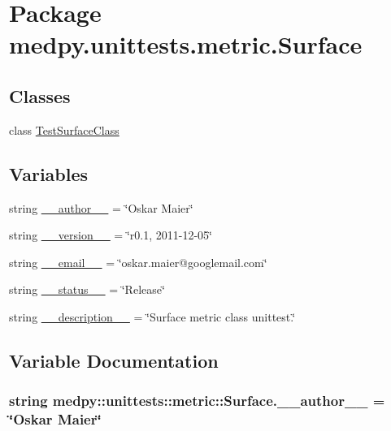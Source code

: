 \hypertarget{namespacemedpy_1_1unittests_1_1metric_1_1Surface}{
\section{Package medpy.unittests.metric.Surface}
\label{namespacemedpy_1_1unittests_1_1metric_1_1Surface}
}
\subsection*{Classes}
\begin{DoxyCompactItemize}
\item 
class \hyperlink{classmedpy_1_1unittests_1_1metric_1_1Surface_1_1TestSurfaceClass}{TestSurfaceClass}
\end{DoxyCompactItemize}
\subsection*{Variables}
\begin{DoxyCompactItemize}
\item 
string \hyperlink{namespacemedpy_1_1unittests_1_1metric_1_1Surface_aa477981e48d06be6e9008b68154da233}{\_\-\_\-author\_\-\_\-} = \char`\"{}Oskar Maier\char`\"{}
\item 
string \hyperlink{namespacemedpy_1_1unittests_1_1metric_1_1Surface_adf05ce1f02cfc20513e1f47d683a7b88}{\_\-\_\-version\_\-\_\-} = \char`\"{}r0.1, 2011-\/12-\/05\char`\"{}
\item 
string \hyperlink{namespacemedpy_1_1unittests_1_1metric_1_1Surface_a26aab81b5eee1872944e4e6d8e16be84}{\_\-\_\-email\_\-\_\-} = \char`\"{}oskar.maier@googlemail.com\char`\"{}
\item 
string \hyperlink{namespacemedpy_1_1unittests_1_1metric_1_1Surface_a8b53340057370b0f215a4e1f8e2e47ad}{\_\-\_\-status\_\-\_\-} = \char`\"{}Release\char`\"{}
\item 
string \hyperlink{namespacemedpy_1_1unittests_1_1metric_1_1Surface_a93a669867ec52b47e2d765f042753f20}{\_\-\_\-description\_\-\_\-} = \char`\"{}Surface metric class unittest.\char`\"{}
\end{DoxyCompactItemize}


\subsection{Variable Documentation}
\hypertarget{namespacemedpy_1_1unittests_1_1metric_1_1Surface_aa477981e48d06be6e9008b68154da233}{
\subsubsection[{\_\-\_\-author\_\-\_\-}]{\setlength{\rightskip}{0pt plus 5cm}string {\bf medpy::unittests::metric::Surface.\_\-\_\-author\_\-\_\-} = \char`\"{}Oskar Maier\char`\"{}}}
\label{namespacemedpy_1_1unittests_1_1metric_1_1Surface_aa477981e48d06be6e9008b68154da233}


